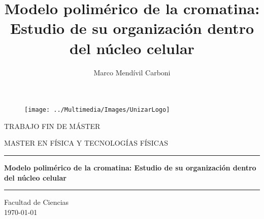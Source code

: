 \documentclass[a4paper,11pt]{report}
\title{Modelo polimérico de la cromatina: Estudio de su organización dentro del núcleo celular}
\author{Marco Mendívil Carboni}
\begin{document}
\renewcommand{\contentsname}{Índice}
\renewcommand{\tablename}{Tabla}


\begin{titlepage}
  \vspace*{4mm}
  \begin{figure}[h]
    \centering
    \texttt{[image: ../Multimedia/Images/UnizarLogo]}
  \end{figure}
  \vspace*{8mm}
  \begin{center}
    \Large TRABAJO FIN DE MÁSTER
  \end{center}
  \begin{center}
    \Large MASTER EN FÍSICA Y TECNOLOGÍAS FÍSICAS
  \end{center}
  \vspace*{8mm}
  \hrule
  \vspace*{4mm}
  \begin{center}
    \huge\bf Modelo polimérico de la cromatina: Estudio de su organización dentro del núcleo celular
  \end{center}
  \vspace*{4mm}
  \hrule
  \vspace*{20mm}
  \vspace*{8mm}
  \vfill
  \begin{center}
    \large Facultad de Ciencias\\
    \today\\
  \end{center}
\end{titlepage}

\clearpage
\thispagestyle{empty}\hfill
\clearpage



\newpage

\tableofcontents
\newpage


\begingroup

\let\clearpage\relax











\begin{spacing}{0.0}
  
  
\end{spacing}
\newpage

\endgroup

\clearpage
\thispagestyle{empty}\hfill
\clearpage
\end{document}
